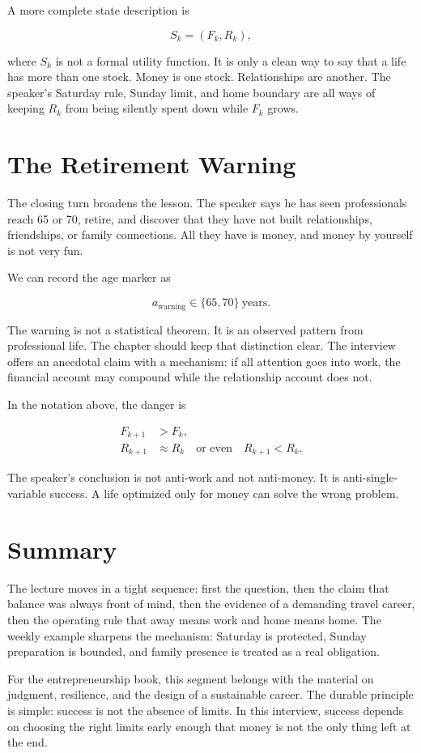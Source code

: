 A more complete state description is

\begin{equation}
S_k=(F_k,R_k),
\end{equation}

where \(S_k\) is not a formal utility function. It is only a clean way to say that a life has more than one stock. Money is one stock. Relationships are another. The speaker's Saturday rule, Sunday limit, and home boundary are all ways of keeping \(R_k\) from being silently spent down while \(F_k\) grows.

\section{The Retirement Warning}

The closing turn broadens the lesson. The speaker says he has seen professionals reach 65 or 70, retire, and discover that they have not built relationships, friendships, or family connections. All they have is money, and money by yourself is not very fun.

We can record the age marker as

\begin{equation}
a_{\text{warning}}\in \{65,70\}\ \text{years}.
\end{equation}

The warning is not a statistical theorem. It is an observed pattern from professional life. The chapter should keep that distinction clear. The interview offers an anecdotal claim with a mechanism: if all attention goes into work, the financial account may compound while the relationship account does not.

In the notation above, the danger is

\begin{align}
F_{k+1} &> F_k,\\
R_{k+1} &\approx R_k
\quad \text{or even} \quad
R_{k+1}<R_k.
\end{align}

The speaker's conclusion is not anti-work and not anti-money. It is anti-single-variable success. A life optimized only for money can solve the wrong problem.

\section{Summary}

The lecture moves in a tight sequence: first the question, then the claim that balance was always front of mind, then the evidence of a demanding travel career, then the operating rule that away means work and home means home. The weekly example sharpens the mechanism: Saturday is protected, Sunday preparation is bounded, and family presence is treated as a real obligation.

For the entrepreneurship book, this segment belongs with the material on judgment, resilience, and the design of a sustainable career. The durable principle is simple: success is not the absence of limits. In this interview, success depends on choosing the right limits early enough that money is not the only thing left at the end.